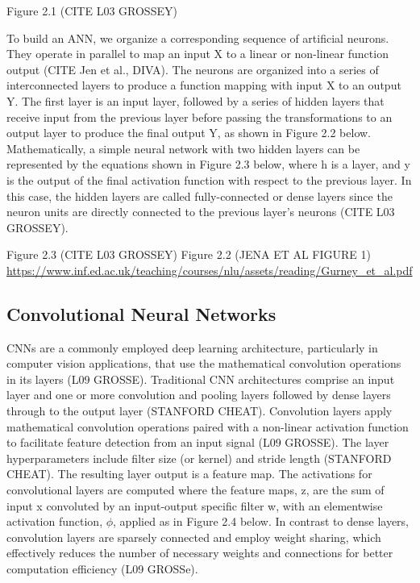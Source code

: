 \documentclass{article}
\begin{document}
Figure 2.1 (CITE L03 GROSSEY)

To build an ANN, we organize a corresponding sequence of artificial neurons. They operate in parallel to map an input X to a linear or non-linear function output (CITE Jen et al., DIVA). The neurons are organized into a series of interconnected layers to produce a function mapping with input X to an output Y. The first layer is an input layer, followed by a series of hidden layers that receive input from the previous layer before passing the transformations to an output layer to produce the final output Y, as shown in Figure 2.2 below. Mathematically, a simple neural network with two hidden layers can be represented by the equations shown in Figure 2.3 below, where h is a layer, and y is the output of the final activation function with respect to the previous layer. In this case, the hidden layers are called fully-connected or dense layers since the neuron units are directly connected to the previous layer’s neurons (CITE L03 GROSSEY).
 
Figure 2.3 (CITE L03 GROSSEY)
Figure 2.2 (JENA ET AL FIGURE 1)
\url{https://www.inf.ed.ac.uk/teaching/courses/nlu/assets/reading/Gurney_et_al.pdf }

\subsection{Convolutional Neural Networks}
CNNs are a commonly employed deep learning architecture, particularly in computer vision applications, that use the mathematical convolution operations in its layers (L09 GROSSE). Traditional CNN architectures comprise an input layer and one or more convolution and pooling layers followed by dense layers through to the output layer (STANFORD CHEAT). 
Convolution layers apply mathematical convolution operations paired with a non-linear activation function to facilitate feature detection from an input signal (L09 GROSSE). The layer hyperparameters include filter size (or kernel) and stride length (STANFORD CHEAT). The resulting layer output is a feature map.  The activations for convolutional layers are computed where the feature maps, z, are the sum of input x convoluted by an input-output specific filter w, with an elementwise activation function, $\phi$, applied as in Figure 2.4 below. In contrast to dense layers, convolution layers are sparsely connected and employ weight sharing, which effectively reduces the number of necessary weights and connections for better computation efficiency (L09 GROSSe). 
 
\end{document}
